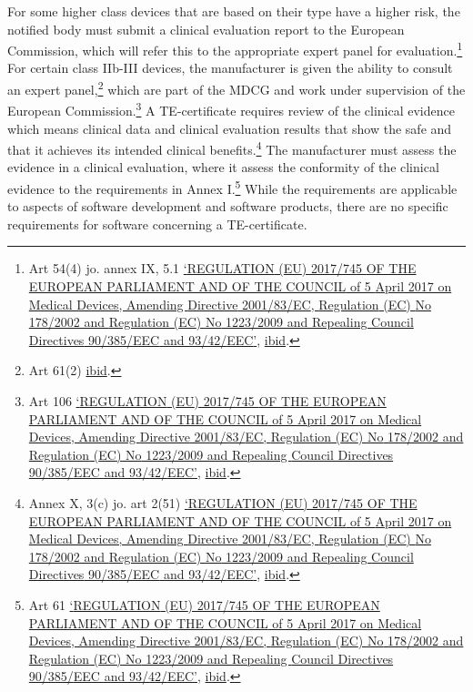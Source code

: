 \documentclass[
]{scrartcl}
\begin{document}
For some higher class devices that are based on their type have a higher risk, the notified body must submit a clinical evaluation report to the European Commission, which will refer this to the appropriate expert panel for evaluation.\footnote{Art 54(4) jo. annex IX, 5.1 \protect\hyperlink{ref-REGULATIONEU2017a}{{`{REGULATION} ({EU}) 2017/745 {OF THE EUROPEAN PARLIAMENT AND OF THE COUNCIL} of 5 {April} 2017 on Medical Devices, Amending {Directive} 2001/83/{EC}, {Regulation} ({EC}) {No} 178/2002 and {Regulation} ({EC}) {No} 1223/2009 and Repealing {Council Directives} 90/385/{EEC} and 93/42/{EEC}'}}, \protect\hyperlink{ref-REGULATIONEU2017a}{ibid}.} For certain class IIb-III devices, the manufacturer is given the ability to consult an expert panel,\footnote{Art 61(2) \protect\hyperlink{ref-REGULATIONEU2017a}{ibid}.} which are part of the MDCG and work under supervision of the European Commission.\footnote{Art 106 \protect\hyperlink{ref-REGULATIONEU2017a}{{`{REGULATION} ({EU}) 2017/745 {OF THE EUROPEAN PARLIAMENT AND OF THE COUNCIL} of 5 {April} 2017 on Medical Devices, Amending {Directive} 2001/83/{EC}, {Regulation} ({EC}) {No} 178/2002 and {Regulation} ({EC}) {No} 1223/2009 and Repealing {Council Directives} 90/385/{EEC} and 93/42/{EEC}'}}, \protect\hyperlink{ref-REGULATIONEU2017a}{ibid}.} A TE-certificate requires review of the clinical evidence which means clinical data and clinical evaluation results that show the safe and that it achieves its intended clinical benefits.\footnote{Annex X, 3(c) jo. art 2(51) \protect\hyperlink{ref-REGULATIONEU2017a}{{`{REGULATION} ({EU}) 2017/745 {OF THE EUROPEAN PARLIAMENT AND OF THE COUNCIL} of 5 {April} 2017 on Medical Devices, Amending {Directive} 2001/83/{EC}, {Regulation} ({EC}) {No} 178/2002 and {Regulation} ({EC}) {No} 1223/2009 and Repealing {Council Directives} 90/385/{EEC} and 93/42/{EEC}'}}, \protect\hyperlink{ref-REGULATIONEU2017a}{ibid}.} The manufacturer must assess the evidence in a clinical evaluation, where it assess the conformity of the clinical evidence to the requirements in Annex I.\footnote{Art 61 \protect\hyperlink{ref-REGULATIONEU2017a}{{`{REGULATION} ({EU}) 2017/745 {OF THE EUROPEAN PARLIAMENT AND OF THE COUNCIL} of 5 {April} 2017 on Medical Devices, Amending {Directive} 2001/83/{EC}, {Regulation} ({EC}) {No} 178/2002 and {Regulation} ({EC}) {No} 1223/2009 and Repealing {Council Directives} 90/385/{EEC} and 93/42/{EEC}'}}, \protect\hyperlink{ref-REGULATIONEU2017a}{ibid}.} While the requirements are applicable to aspects of software development and software products, there are no specific requirements for software concerning a TE-certificate.
\end{document}
